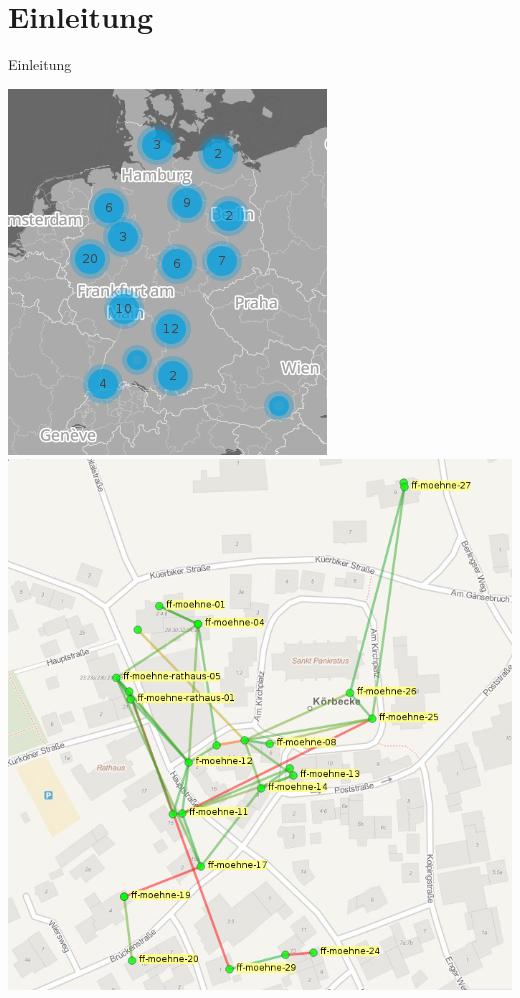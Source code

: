 \documentclass{beamer}
\begin{document}
\section{Einleitung}
\begin{frame}{Einleitung}
\vfill
\begin{center}
\includegraphics[height=0.6\textheight]{images/map}$\;$
\includegraphics[height=0.6\textheight]{images/moehne}
\end{center}
\vfill
\end{frame}
\end{document}
